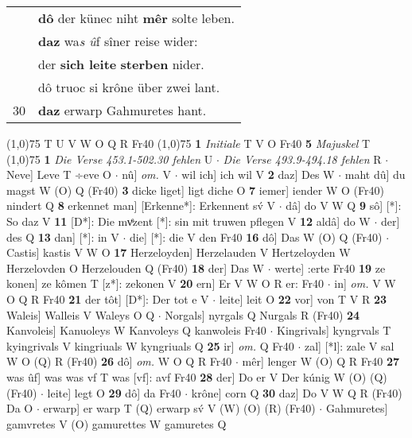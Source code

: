 \documentclass[8pt,a4paper,notitlepage]{article}
\begin{document}
\begin{table}[ht]
\begin{minipage}[t]{0.5\linewidth}
\begin{tabular}{rl}
 & \textbf{dô} der künec niht \textbf{mêr} solte leben.\\ 
 & \textbf{daz} wa\textit{s û}f sîner reise wider:\\ 
 & der \textbf{sich leite} \textbf{sterben} nider.\\ 
 & dô truoc si krône über zwei lant.\\ 
30 & \textbf{daz} erwarp Gahmuretes hant.\\ 
\end{tabular}
\scriptsize
\line(1,0){75} \newline
T U V W O Q R Fr40 \newline
\line(1,0){75} \newline
\textbf{1} \textit{Initiale} T V O Fr40  \textbf{5} \textit{Majuskel} T  \newline
\line(1,0){75} \newline
\textbf{1} \textit{Die Verse 453.1-502.30 fehlen} U   $\cdot$ \textit{Die Verse 493.9-494.18 fehlen} R   $\cdot$ Neve] Leve T ÷eve O  $\cdot$ nû] \textit{om.} V  $\cdot$ wil ich] ich wil V \textbf{2} daz] Des W  $\cdot$ maht dû] du magst W (O) Q (Fr40) \textbf{3} dicke liget] ligt diche O \textbf{7} iemer] iender W O (Fr40) nindert Q \textbf{8} erkennet man] [Erkenne*]: Erkennent sv́ V  $\cdot$ dâ] do V W Q \textbf{9} sô] [*]: So daz V \textbf{11} [D*]: Die mvͤzent [*]: sin mit truwen pflegen V \textbf{12} aldâ] do W  $\cdot$ der] des Q \textbf{13} dan] [*]: in V  $\cdot$ die] [*]: die V den Fr40 \textbf{16} dô] Das W (O) Q (Fr40)  $\cdot$ Castis] kastis V W O \textbf{17} Herzeloyden] Herzelauden V Hertzeloyden W Herzelovden O Herzelouden Q (Fr40) \textbf{18} der] Das W  $\cdot$ werte] :erte Fr40 \textbf{19} ze konen] ze kômen T [z*]: zekonen V \textbf{20} ern] Er V W O R er: Fr40  $\cdot$ in] \textit{om.} V W O Q R Fr40 \textbf{21} der tôt] [D*]: Der tot e V  $\cdot$ leite] leit O \textbf{22} vor] von T V R \textbf{23} Waleis] Walleis V Waleys O Q  $\cdot$ Norgals] nyrgals Q Nurgals R (Fr40) \textbf{24} Kanvoleis] Kanuoleys W Kanvoleys Q kanwoleis Fr40  $\cdot$ Kingrivals] kyngrvals T kyingrivals V kingriuals W kyngriuals Q \textbf{25} ir] \textit{om.} Q Fr40  $\cdot$ zal] [*l]: zale V sal W O (Q) R (Fr40) \textbf{26} dô] \textit{om.} W O Q R Fr40  $\cdot$ mêr] lenger W (O) Q R Fr40 \textbf{27} was ûf] was was vf T was [vf]: avf Fr40 \textbf{28} der] Do er V Der kúnig W (O) (Q) (Fr40)  $\cdot$ leite] legt O \textbf{29} dô] da Fr40  $\cdot$ krône] corn Q \textbf{30} daz] Do V W Q R (Fr40) Da O  $\cdot$ erwarp] er warp T (Q) erwarp sv́ V (W) (O) (R) (Fr40)  $\cdot$ Gahmuretes] gamvretes V (O) gamurettes W gamuretes Q \newline
\end{minipage}
\end{table}
\end{document}
